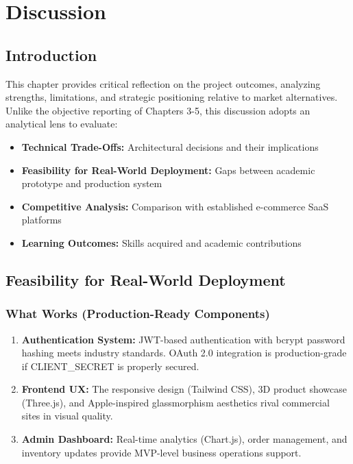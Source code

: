 \documentclass[12pt, a4paper]{report}
\begin{document}

\chapter{Discussion}

\section{Introduction}

This chapter provides critical reflection on the project outcomes, analyzing strengths, limitations, and strategic positioning relative to market alternatives. Unlike the objective reporting of Chapters 3-5, this discussion adopts an analytical lens to evaluate:

\begin{itemize}
    \item \textbf{Technical Trade-Offs:} Architectural decisions and their implications
    \item \textbf{Feasibility for Real-World Deployment:} Gaps between academic prototype and production system
    \item \textbf{Competitive Analysis:} Comparison with established e-commerce SaaS platforms
    \item \textbf{Learning Outcomes:} Skills acquired and academic contributions
\end{itemize}



\section{Feasibility for Real-World Deployment}

\subsection{What Works (Production-Ready Components)}

\begin{enumerate}
    \item \textbf{Authentication System:} JWT-based authentication with bcrypt password hashing meets industry standards. OAuth 2.0 integration is production-grade if CLIENT\_SECRET is properly secured.
    
    \item \textbf{Frontend UX:} The responsive design (Tailwind CSS), 3D product showcase (Three.js), and Apple-inspired glassmorphism aesthetics rival commercial sites in visual quality.
    
    \item \textbf{Admin Dashboard:} Real-time analytics (Chart.js), order management, and inventory updates provide MVP-level business operations support.
\end{enumerate}
\end{document}
